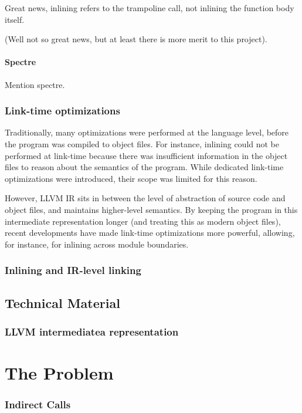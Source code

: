\documentclass[12pt,a4paper,twoside]{report}
\begin{document}
Great news, inlining refers to the trampoline call, not inlining the function body itself.

(Well not so great news, but at least there is more merit to this project).

\subsubsection{Spectre}

Mention spectre.

\subsection{Link-time optimizations}

Traditionally, many optimizations were performed at the language level, before the program was compiled to object files. For instance, inlining could not be performed at link-time because there was insufficient information in the object files to reason about the semantics of the program. While dedicated link-time optimizations were introduced, their scope was limited for this reason.

However, LLVM IR sits in between the level of abstraction of source code and object files, and maintains higher-level semantics. By keeping the program in this intermediate representation longer (and treating this as modern object files), recent developments have made link-time optimizations more powerful, allowing, for instance, for inlining across module boundaries.



\subsection{Inlining and IR-level linking}

\section{Technical Material}

\subsection{LLVM intermediatea representation}

\chapter{The Problem}

\subsection {Indirect Calls}
\end{document}
